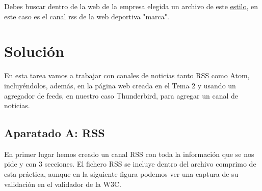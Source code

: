 Debes buscar dentro de la web de la empresa elegida un archivo de este \href{https://e00-marca.uecdn.es/rss/portada.xml}{estilo}, en este caso es el canal rss de la web deportiva "marca".

\section{Solución}
En esta tarea vamos a trabajar con canales de noticias tanto RSS como Atom, incluyéndolos, además, en la página web creada en el Tema 2 y usando un agregador de feeds, en nuestro caso Thunderbird, para agregar un canal de noticias.

\subsection{Aparatado A: RSS}

En primer lugar hemos creado un canal RSS con toda la información que se nos pide y con 3 secciones. El fichero RSS se incluye dentro del archivo comprimo de esta práctica, aunque en la siguiente figura podemos ver una captura de su validación en el validador de la W3C.

\newpage




